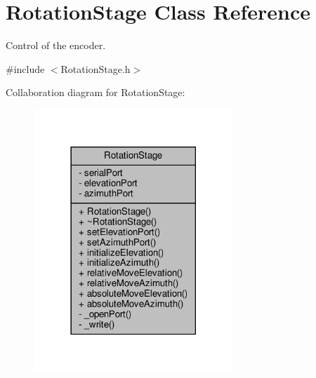 \hypertarget{class_rotation_stage}{}\section{Rotation\+Stage Class Reference}
\label{class_rotation_stage}


Control of the encoder.  




{\ttfamily \#include $<$Rotation\+Stage.\+h$>$}



Collaboration diagram for Rotation\+Stage\+:
\nopagebreak
\begin{figure}[H]
\begin{center}
\leavevmode
\includegraphics[width=213pt]{class_rotation_stage__coll__graph}
\end{center}
\end{figure}
